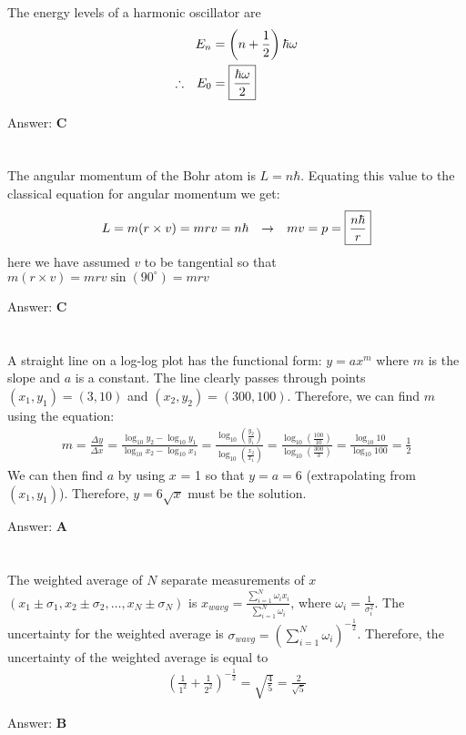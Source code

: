 \documentclass[12pt]{article}
\newcommand{\Answer}[1]{Answer: \textbf{#1}}
\newcommand{\Problem}[3]{
    \setcounter{section}{#1}
    \addtocounter{section}{-1}
    \section{}
    #3\par\par
    \Answer{#2}
}
\begin{document}
\Problem{11}{C}{
The energy levels of a harmonic oscillator are
\begin{align}
E_n &= \left(n+\frac{1}{2}\right)\hbar\omega\\
\therefore \hspace{.1in} E_0 &= \boxed{\frac{\hbar\omega}{2}}\nonumber
\end{align}
}

\Problem{12}{C}{
The angular momentum of the Bohr atom is $L = n\hbar$. Equating this value to the classical equation for angular momentum we get:
\begin{align}
L = m(r \times v) = mrv = n\hbar \hspace{.1in}  \rightarrow \hspace{.1in}  mv = p = \boxed{\frac{n\hbar}{r}}
\end{align}
here we have assumed $v$ to be tangential so that $m(r \times v) = m r v \sin{(90^{\circ})} = mrv$
}

\Problem{13}{A}{
A straight line on a log-log plot has the functional form: \textbf{$y = ax^{m}$} where $m$ is the slope and $a$ is a constant. The line clearly passes through points $(x_{1}, y_{1} ) = (3,10)$ and $(x_{2}, y_{2} ) = (300,100)$. Therefore, we can find $m$ using the equation:
\begin{align}
m =\frac{\Delta y}{ \Delta x} = \frac{\log_{10} y_{2} - \log_{10} y_{1}}{\log_{10} x_{2} - \log_{10} x_{1}} = \frac{\log_{10}\left(\frac{y_{2}}{y_{1}}\right)}{\log_{10}\left(\frac{x_{2}}{x_{1}}\right)} = \frac{\log_{10}\left(\frac{100}{10}\right)}{\log_{10}\left(\frac{300}{3}\right)} = \frac{\log_{10}10}{\log_{10}100} = \frac{1}{2}\nonumber
\end{align}
We can then find $a$ by using $x$ = 1 so that $y = a = 6$ (extrapolating from $(x_{1}, y_{1})$). Therefore, $y = 6\sqrt{x}$ must be the solution.
}

\Problem{14}{B}{The weighted average of $N$ separate measurements  of $x$ $(x_1\pm\sigma_1, x_2\pm\sigma_2, \ldots, x_N\pm\sigma_N)$ is $x_{wavg} = \frac{\sum_{i=1}^{N}\omega_i x_i}{\sum_{i=1}^{N}\omega_i}$, where $\omega_i = \frac{1}{\sigma_i^2}$. The uncertainty for the weighted average is $\sigma_{wavg} = {\left(\sum_{i=1}^{N}\omega_i\right)}^{-\frac{1}{2}}$. Therefore, the uncertainty of the weighted average is equal to
\begin{align}
{\left(\frac{1}{1^2}+\frac{1}{2^2}\right)}^{-\frac{1}{2}}= \sqrt{\frac{4}{5}} = \boxed{\frac{2}{\sqrt{5}}}\nonumber
\end{align}
}
\end{document}

